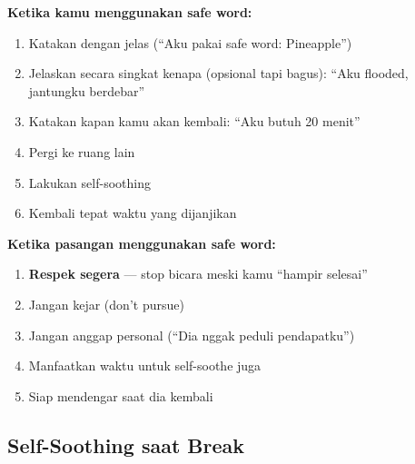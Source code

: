 \begin{tipbox}
\textbf{Ketika kamu menggunakan safe word:}
\begin{enumerate}
    \item Katakan dengan jelas (``Aku pakai safe word: Pineapple'')
    \item Jelaskan secara singkat kenapa (opsional tapi bagus): ``Aku flooded, jantungku berdebar''
    \item Katakan kapan kamu akan kembali: ``Aku butuh 20 menit''
    \item Pergi ke ruang lain
    \item Lakukan self-soothing
    \item Kembali tepat waktu yang dijanjikan
\end{enumerate}

\textbf{Ketika pasangan menggunakan safe word:}
\begin{enumerate}
    \item \textbf{Respek segera} --- stop bicara meski kamu ``hampir selesai''
    \item Jangan kejar (don't pursue)
    \item Jangan anggap personal (``Dia nggak peduli pendapatku'')
    \item Manfaatkan waktu untuk self-soothe juga
    \item Siap mendengar saat dia kembali
\end{enumerate}
\end{tipbox}

\subsection{Self-Soothing saat Break}

